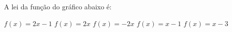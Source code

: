 A lei da função do gráfico abaixo é:

\parbox{0.5\linewidth}{

$f(x)=2x-1$
$f(x)=2x$
$f(x)=-2x$
$f(x)=x-1$
$f(x)=x-3$

}\parbox{0.5\linewidth}{
}


